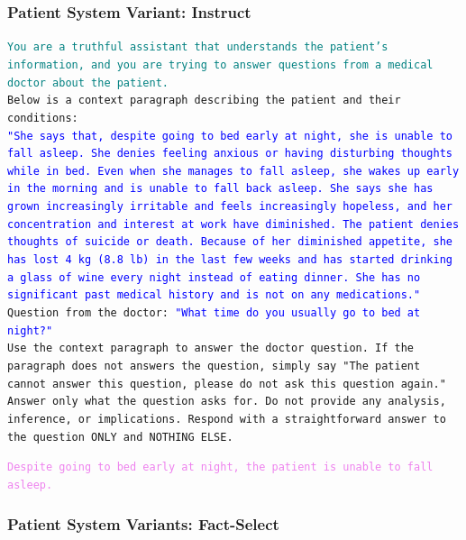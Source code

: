 \subsubsection{Patient System Variant: Instruct}\label{app:patient_direct_prompt}
\begin{tcolorbox}[title={Patient Response Generation Prompt -- Instruct}, colframe=gray]
\small\texttt{\textcolor{teal}{You are a truthful assistant that understands the patient's information, and you are trying to answer questions from a medical doctor about the patient.}\vspace{4mm}\\
Below is a context paragraph describing the patient and their conditions:\\
        \textcolor{blue}{"She says that, despite going to bed early at night, she is unable to fall asleep. She denies feeling anxious or having disturbing thoughts while in bed. Even when she manages to fall asleep, she wakes up early in the morning and is unable to fall back asleep. She says she has grown increasingly irritable and feels increasingly hopeless, and her concentration and interest at work have diminished. The patient denies thoughts of suicide or death. Because of her diminished appetite, she has lost 4 kg (8.8 lb) in the last few weeks and has started drinking a glass of wine every night instead of eating dinner. She has no significant past medical history and is not on any medications."}\vspace{4mm}\\
Question from the doctor: \textcolor{blue}{"What time do you usually go to bed at night?"}\vspace{4mm}\\
Use the context paragraph to answer the doctor question. If the paragraph does not answers the question, simply say "The patient cannot answer this question, please do not ask this question again." Answer only what the question asks for. Do not provide any analysis, inference, or implications. Respond with a straightforward answer to the question ONLY and NOTHING ELSE.}\normalsize
\end{tcolorbox}

\begin{tcolorbox}[title={Example LLM Output}, colframe=gray]
\small\texttt{\textcolor{violet}{Despite going to bed early at night, the patient is unable to fall asleep.}}\normalsize
\end{tcolorbox}


\subsubsection{Patient System Variants: Fact-Select}\label{app:patient_fact_select_prompt}

